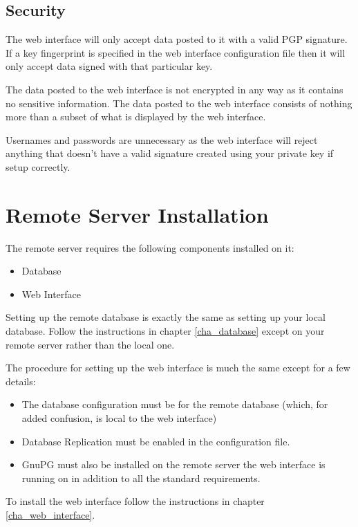 \documentclass[a4paper,10pt,draft]{book}
\begin{document}
\subsection{Security}
\label{sec_dbr_security}

The web interface will only accept data posted to it with a valid PGP signature. If a key fingerprint is specified in the web interface configuration file then it will only accept data signed with that particular key.

The data posted to the web interface is not encrypted in any way as it contains no sensitive information. The data posted to the web interface consists of nothing more than a subset of what is displayed by the web interface.

Usernames and passwords are unnecessary as the web interface will reject anything that doesn't have a valid signature created using your private key if setup correctly.


\section{Remote Server Installation}

The remote server requires the following components installed on it:
\begin{itemize}
\item Database
\item Web Interface
\end{itemize}

Setting up the remote database is exactly the same as setting up your local database. Follow the instructions in chapter \ref{cha_database} except on your remote server rather than the local one.

The procedure for setting up the web interface is much the same except for a few details:
\begin{itemize}
\item The database configuration must be for the remote database (which, for added confusion, is local to the web interface)
\item Database Replication must be enabled in the configuration file.
\item GnuPG must also be installed on the remote server the web interface is running on in addition to all the standard requirements.
\end{itemize}

To install the web interface follow the instructions in chapter \ref{cha_web_interface}.
\end{document}
